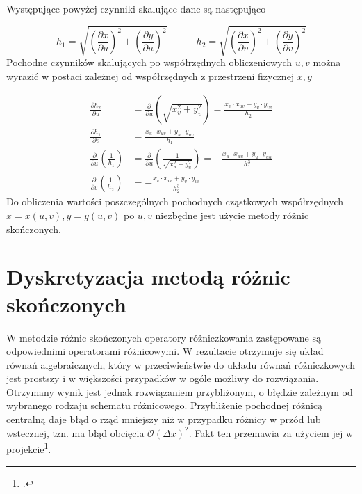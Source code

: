 \noindent Występujące powyżej czynniki skalujące dane są następująco

\begin{equation}
h_1 = \sqrt{\left(\frac{\partial x}{\partial u}\right)^2+\left(\frac{\partial y}{\partial u}\right)^2}
\quad\quad\quad
h_2 = \sqrt{\left(\frac{\partial x}{\partial v}\right)^2+\left(\frac{\partial y}{\partial v}\right)^2}
\end{equation}
\newline
\noindent Pochodne czynników skalujących po współrzędnych obliczeniowych $u,v$ można wyrazić w postaci zależnej od współrzędnych z przestrzeni fizycznej $x,y$ 

\begin{equation}
\label{eq:poch_wsp_skal}
\begin{split}
\frac{\partial h_2}{\partial u} &= \frac{\partial}{\partial u}\left(\sqrt{x_v^2+y_v^2} \right)=\frac{x_v\cdot x_{uv}+y_v\cdot y_{vv}}{h_2} 
\\
\frac{\partial h_1}{\partial v} &= \frac{x_u\cdot x_{uv} + y_u\cdot y_{uv}}{h_1} 
\\
\frac{\partial}{\partial u}\left(\frac{1}{h_1}\right)&=\frac{\partial}{\partial u}\left(\frac{1}{\sqrt{x_u^2+y_u^2}}\right)= - \frac{x_u\cdot x_{uu} + y_u\cdot y_{uu}}{h_1^3}
\\
\frac{\partial}{\partial v}\left(\frac{1}{h_2}\right)&=-\frac{x_v\cdot x_{vv}+y_v\cdot y_{vv}}{h_2^3}
\end{split}
\end{equation}
\newline
\noindent Do obliczenia wartości poszczególnych pochodnych cząstkowych współrzędnych $x = x(u,v), y = y(u,v)$ po $u,v$ niezbędne jest użycie metody różnic skończonych.

\section{Dyskretyzacja metodą różnic skończonych}
\indent\indent W metodzie różnic skończonych operatory różniczkowania zastępowane są odpowiednimi operatorami różnicowymi. W rezultacie otrzymuje się układ równań algebraicznych, który w przeciwieństwie do układu równań różniczkowych jest prostszy i w większości przypadków w ogóle możliwy do rozwiązania. Otrzymany wynik jest jednak rozwiązaniem przybliżonym, o błędzie zależnym od wybranego rodzaju schematu różnicowego. Przybliżenie pochodnej różnicą centralną daje błąd o rząd mniejszy niż w przypadku różnicy w przód lub wstecznej, tzn. ma błąd obcięcia $\mathcal{O}(\Delta x)^2$. Fakt ten przemawia za użyciem jej w projekcie\footcite{Anderson, s. 132}.

